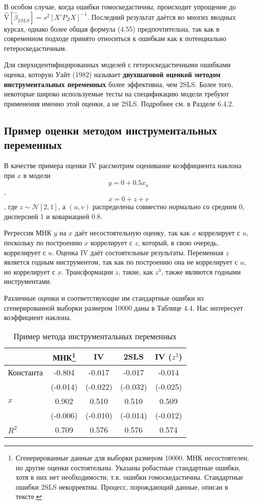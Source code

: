 В особом случае, когда ошибки гомоскедастичны, происходит упрощение до $\hat{\mathrm{V}}[\hat{\beta}_{2SLS}] = s^2 [X'P_ZX]^{-1}$. Последний результат даётся во многих вводных курсах, однако более общая формула (4.55) предпочтительна, так как в современном подходе принято  относиться к ошибкам как к потенциально гетероскедастичным.

Для сверхидентифицированных моделей с гетероскедастичными ошибками оценка, которую Уайт (1982) называет \textbf{двухшаговой оценкой методом инструментальных переменных} более эффективна, чем 2SLS. Более того, некоторые широко используемые тесты на спецификацию модели требуют применения именно этой оценки, а не 2SLS. Подробнее см. в Разделе 6.4.2.

\subsection{Пример оценки методом инструментальных переменных}

В качестве примера оценки IV рассмотрим оценивание коэффициента наклона при $x$ в модели	
$$ y = 0+0.5x_u $$,
$$x = 0+z+v $$,
где $z \sim \mathcal{N} [2,1]$, а $(u,v)$ распределены совместно нормально со средним 0, дисперсией 1 и ковариацией 0.8. 

Регрессия МНК $y$ на $x$ даёт несостоятельную оценку, так как $x$ коррелирует с $u$, поскольку по построению $x$ коррелирует с $z$, который, в свою очередь, коррелирует с  $u$. Оценка IV даёт состоятельные результаты. Переменная $z$ является годным инструментом, так как по построению она не коррелирует с $u$, но коррелирует с $x$. Трансформации $z$, такие, как $z^3$, также являются годными инструментами.

Различные оценки и соответствующие им стандартные ошибки из сгенерированной выборки размером 10000 даны в Таблице 4.4. Нас интересует коэффициент наклона. 

\begin{table}[h]
\caption{\label{tab:iv}Пример метода инструментальных переменных}
\begin{minipage}{\textwidth}
\begin{tabular}[t]{lcccc}
\hline
\hline
& \bf{МНК}\footnote{Сгенерированные данные для выборки размером 10000. МНК несостоятелен, но другие оценки состоятельны. Указаны робастные стандартные ошибки, хотя в них нет необходимости, т.к. ошибки гомоскедастичны. Стандартные ошибки 2SLS некорректны. Процесс, порождающий данные, описан в тексте.} & \bf{IV} & \bf{2SLS} & \bf{IV ($z^3$)}  \\
\hline
Константа & -0.804 & -0.017 & -0.017 & -0.014 \\
 & (-0.014) & (-0.022) & (-0.032) & (-0.025) \\
$x$ & 0.902 & 0.510 & 0.510 & 0.509 \\
 & (-0.006) & (-0.010) & (-0.014) & (-0.012) \\
$R^2$ & 0.709 & 0.576 & 0.576 & 0.574 \\
\hline
\hline
\end{tabular}
\end{minipage}
\end{table}

